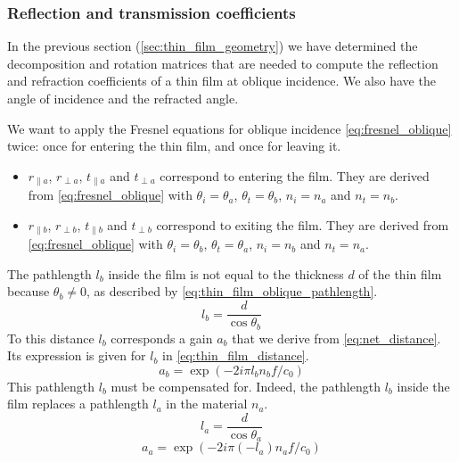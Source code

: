 \subsubsection{Reflection and transmission coefficients}
In the previous section (\cref{sec:thin_film_geometry}) we have determined the decomposition and rotation matrices that are needed to compute the reflection and refraction coefficients of a thin film at oblique incidence.
We also have the angle of incidence and the refracted angle.

We want to apply the Fresnel equations for oblique incidence \eqref{eq:fresnel_oblique} twice:
once for entering the thin film, and once for leaving it.
\begin{itemize}
    \item 
$r_{\parallel a}$, $r_{\perp a}$, $t_{\parallel a}$ and $t_{\perp a}$ correspond to entering the film.
They are derived from \cref{eq:fresnel_oblique} with
$\theta_i = \theta_a$, $\theta_t = \theta_b$,
$n_i = n_a$ and $n_t = n_b$.
    \item
$r_{\parallel b}$, $r_{\perp b}$, $t_{\parallel b}$ and $t_{\perp b}$ correspond to exiting the film.
They are derived from \cref{eq:fresnel_oblique} with
$\theta_i = \theta_b$, $\theta_t = \theta_a$,
$n_i = n_b$ and $n_t = n_a$.
\end{itemize}

The pathlength $l_b$ inside the film is not equal to the thickness $d$ of the thin film because $\theta_b \ne 0$, as described by \cref{eq:thin_film_oblique_pathlength}.
\begin{equation}
    l_b = \frac{d}{\cos \theta_b}
    \label{eq:thin_film_oblique_pathlength}
\end{equation}
To this distance $l_b$ corresponds a gain $a_b$ that we derive from \cref{eq:net_distance}.
Its expression is given for $l_b$ in \cref{eq:thin_film_distance}.
\begin{equation}
    a_b = \exp(-2i \pi l_b n_b f / c_0)
    \label{eq:thin_film_distance}
\end{equation}
This pathlength $l_b$ must be compensated for.
Indeed, the pathlength $l_b$ inside the film replaces a pathlength $l_a$ in the material $n_a$.
\begin{equation}
    l_a = \frac{d}{\cos \theta_a}
    \label{eq:thin_film_oblique_pathlength_compensation}
\end{equation}
\begin{equation}
    a_a = \exp(-2i \pi (-l_a) n_a f / c_0)
    \label{eq:thin_film_distance_compensation}
\end{equation}

